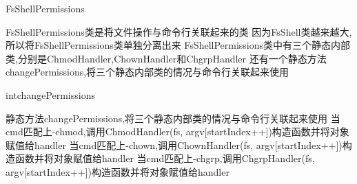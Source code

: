 \begin{XeClass}{FsShellPermissions}
   
 FsShellPermissions类是将文件操作与命令行关联起来的类
 因为FsShell类越来越大,所以将FsShellPermissions类单独分离出来
 FsShellPermissions类中有三个静态内部类,分别是ChmodHandler,ChownHandler和ChgrpHandler
 还有一个静态方法changePermissions,将三个静态内部类的情况与命令行关联起来使用

  \begin{XeMethod}{}{int}{changePermissions}
       
 静态方法changePermissions,将三个静态内部类的情况与命令行关联起来使用
 当cmd匹配上-chmod,调用ChmodHandler(fs, argv[startIndex++])构造函数并将对象赋值给handler
 当cmd匹配上-chown,调用ChownHandler(fs, argv[startIndex++])构造函数并将对象赋值给handler
 当cmd匹配上-chgrp,调用ChgrpHandler(fs, argv[startIndex++])构造函数并将对象赋值给handler

  \end{XeMethod}

\end{XeClass}

